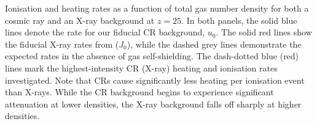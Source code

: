 Ionisation and heating rates as a function of total gas number density for both a cosmic ray and an X-ray background at $z=25$. In both panels, the solid blue lines denote the rate for our fiducial CR background, $u_0$. The solid red lines show the fiducial X-ray rates from \citet{Hummeletal2015} ($J_0$), while the dashed grey lines demonstrate the expected rates in the absence of gas self-shielding.  The dash-dotted blue (red) lines mark the highest-intensity CR (X-ray) heating and ionisation rates investigated. Note that CRs cause significantly less heating per ionisation event than X-rays. While the CR background begins to experience significant attenuation at lower densities, the X-ray background falls off sharply at higher densities. 